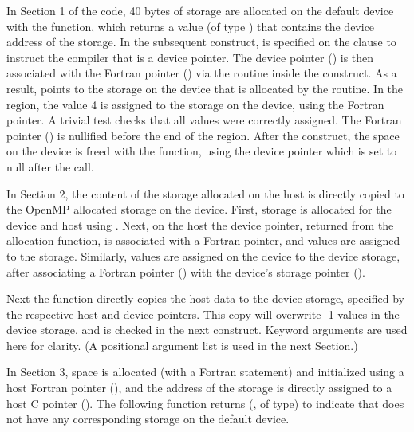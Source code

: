 In Section 1 of the code, 40 bytes of storage are allocated on the default device
with the  function, which returns a value (of type
) that contains the device address of the storage.
In the subsequent  construct,  is specified on the
 clause to instruct the compiler that  is
a device pointer.
The device pointer () is then associated with the Fortran pointer
() via the  routine inside the 
construct.
As a result,  points to the storage on the device that is allocated
by the  routine.
In the  region, the value 4 is assigned to the storage on the device,
using the Fortran pointer.
A trivial test checks that all values were correctly assigned.
The Fortran pointer () is nullified before the end of the  region.
After the  construct, the space on the device is freed with the
 function, using the device  pointer
which is set to null after the call.

In Section 2, the content of the storage allocated on the host is directly copied
to the OpenMP allocated storage on the device.
First, storage is allocated for the device and host using .
Next, on the host the device pointer, returned from the allocation
 function, is associated with a Fortran pointer, and
values are assigned to the storage. Similarly, values are assigned on the device
to the device storage, after associating a Fortran pointer ()
with the device's storage pointer ().

Next the  function directly copies the host data
to the device storage, specified by the respective host and device pointers.
This copy will overwrite -1 values in the device storage, and is checked in the
next  construct.
Keyword arguments are used here for clarity.
(A positional argument list is used in the next Section.)

In Section 3, space is allocated (with a Fortran  statement) and initialized using a
host Fortran pointer (), and the address of the storage is directly assigned to a
host C pointer ().
The following  function returns  (, of  type)
to indicate that  does not have any corresponding storage on the default device.

